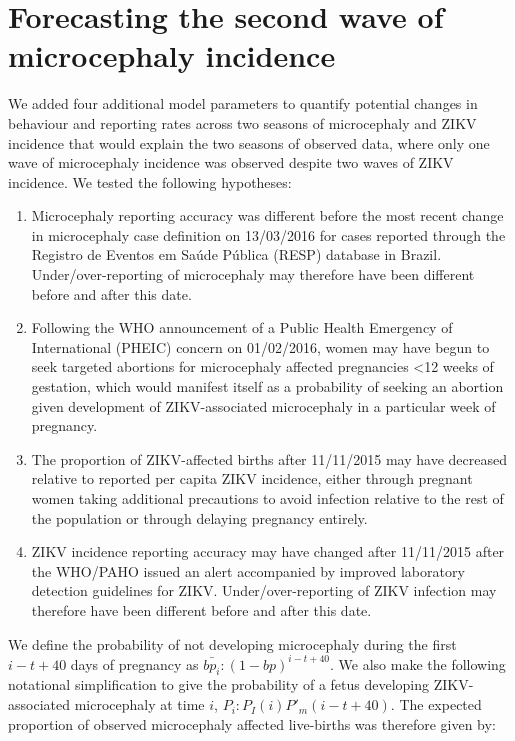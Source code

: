 \documentclass[10pt,letterpaper]{article}
\providecommand{\tightlist}{%
  \setlength{\itemsep}{0pt}\setlength{\parskip}{0pt}}
\begin{document}
\section{Forecasting the second wave of microcephaly
incidence}\label{forecasting-the-second-wave-of-microcephaly-incidence}

We added four additional model parameters to quantify potential changes
in behaviour and reporting rates across two seasons of microcephaly and
ZIKV incidence that would explain the two seasons of observed data,
where only one wave of microcephaly incidence was observed despite two
waves of ZIKV incidence. We tested the following hypotheses:

\begin{enumerate}
\def\labelenumi{\arabic{enumi}.}
\tightlist
\item
  Microcephaly reporting accuracy was different before the most recent
  change in microcephaly case definition on 13/03/2016 for cases
  reported through the Registro de Eventos em Saúde Pública (RESP)
  database in Brazil. Under/over-reporting of microcephaly may therefore
  have been different before and after this date.
\item
  Following the WHO announcement of a Public Health Emergency of
  International (PHEIC) concern on 01/02/2016, women may have begun to
  seek targeted abortions for microcephaly affected pregnancies
  \textless{}12 weeks of gestation, which would manifest itself as a
  probability of seeking an abortion given development of
  ZIKV-associated microcephaly in a particular week of pregnancy.
\item
  The proportion of ZIKV-affected births after 11/11/2015 may have
  decreased relative to reported per capita ZIKV incidence, either
  through pregnant women taking additional precautions to avoid
  infection relative to the rest of the population or through delaying
  pregnancy entirely.
\item
  ZIKV incidence reporting accuracy may have changed after 11/11/2015
  after the WHO/PAHO issued an alert accompanied by improved laboratory
  detection guidelines for ZIKV. Under/over-reporting of ZIKV infection
  may therefore have been different before and after this date.
\end{enumerate}

We define the probability of not developing microcephaly during the
first \(i-t+40\) days of pregnancy as
\(\bar{bp_i} : (1-bp)^{i - t + 40}\). We also make the following
notational simplification to give the probability of a fetus developing
ZIKV-associated microcephaly at time \(i\),
\(P_i : P_I(i)P'_m(i-t+40)\). The expected proportion of observed
microcephaly affected live-births was therefore given by:
\end{document}
